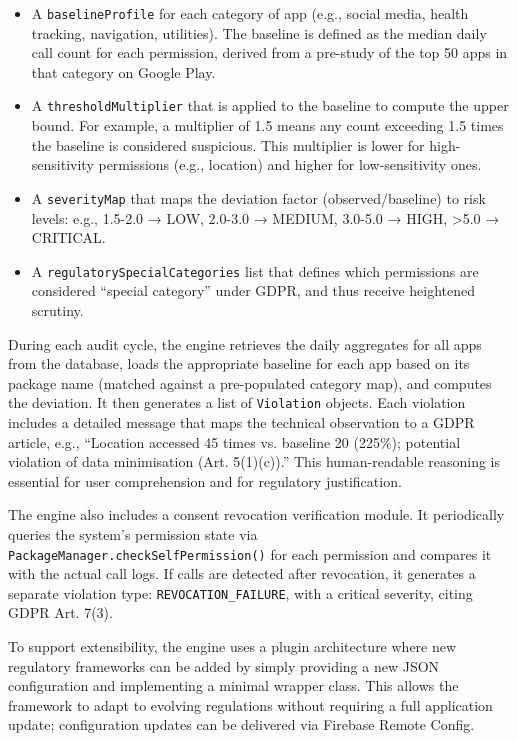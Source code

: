 \begin{itemize}
\item A \texttt{baselineProfile} for each category of app (e.g., social media, health tracking, navigation, utilities). The baseline is defined as the median daily call count for each permission, derived from a pre-study of the top 50 apps in that category on Google Play.
\item A \texttt{thresholdMultiplier} that is applied to the baseline to compute the upper bound. For example, a multiplier of 1.5 means any count exceeding 1.5 times the baseline is considered suspicious. This multiplier is lower for high-sensitivity permissions (e.g., location) and higher for low-sensitivity ones.
\item A \texttt{severityMap} that maps the deviation factor (observed/baseline) to risk levels: e.g., 1.5-2.0 → LOW, 2.0-3.0 → MEDIUM, 3.0-5.0 → HIGH, >5.0 → CRITICAL.
\item A \texttt{regulatorySpecialCategories} list that defines which permissions are considered ``special category'' under GDPR, and thus receive heightened scrutiny.
\end{itemize}

During each audit cycle, the engine retrieves the daily aggregates for all apps from the database, loads the appropriate baseline for each app based on its package name (matched against a pre-populated category map), and computes the deviation. It then generates a list of \texttt{Violation} objects. Each violation includes a detailed message that maps the technical observation to a GDPR article, e.g., ``Location accessed 45 times vs. baseline 20 (225\%); potential violation of data minimisation (Art. 5(1)(c)).'' This human-readable reasoning is essential for user comprehension and for regulatory justification.

The engine also includes a consent revocation verification module. It periodically queries the system's permission state via \texttt{PackageManager.checkSelfPermission()} for each permission and compares it with the actual call logs. If calls are detected after revocation, it generates a separate violation type: \texttt{REVOCATION\_FAILURE}, with a critical severity, citing GDPR Art. 7(3).

To support extensibility, the engine uses a plugin architecture where new regulatory frameworks can be added by simply providing a new JSON configuration and implementing a minimal wrapper class. This allows the framework to adapt to evolving regulations without requiring a full application update; configuration updates can be delivered via Firebase Remote Config.

